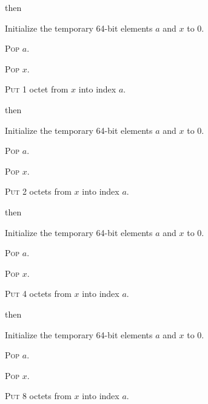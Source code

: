 \documentclass[a4paper,12pt]{article}
\newcommand{\num}[1]{\texttt{#1}}
\newcommand{\hex}[1]{\num{#1}_{\textup{\tiny 16}}}
\newcommand{\proc}[1]{\textsc{#1}}
\newcommand{\op}[1]{$#1$}
\newcommand{\STOREB}    [1]{\op{\hex{14}}}
\newcommand{\STORES}    [1]{\op{\hex{15}}}
\newcommand{\STOREI}    [1]{\op{\hex{16}}}
\newcommand{\STOREL}    [1]{\op{\hex{17}}}
\begin{document}
\begin{stepnumbers}[start=3]
\begin{description}
\begin{stepnumbers}
    \end{stepnumbers}
  \item[\STOREB{}] then
    \begin{stepnumbers}
    \item Initialize the temporary 64-bit elements $a$ and $x$ to 0.
    \item \proc{Pop} $a$.
    \item \proc{Pop} $x$.
    \item \proc{Put} 1 octet from $x$ into index $a$.
    \end{stepnumbers}
  \item[\STORES{}] then
    \begin{stepnumbers}
    \item Initialize the temporary 64-bit elements $a$ and $x$ to 0.
    \item \proc{Pop} $a$.
    \item \proc{Pop} $x$.
    \item \proc{Put} 2 octets from $x$ into index $a$.
    \end{stepnumbers}
  \item[\STOREI{}] then
    \begin{stepnumbers}
    \item Initialize the temporary 64-bit elements $a$ and $x$ to 0.
    \item \proc{Pop} $a$.
    \item \proc{Pop} $x$.
    \item \proc{Put} 4 octets from $x$ into index $a$.
    \end{stepnumbers}
  \item[\STOREL{}] then
    \begin{stepnumbers}
    \item Initialize the temporary 64-bit elements $a$ and $x$ to 0.
    \item \proc{Pop} $a$.
    \item \proc{Pop} $x$.
    \item \proc{Put} 8 octets from $x$ into index $a$.
    \end{stepnumbers}
  \end{description}
\end{stepnumbers}
\end{document}

